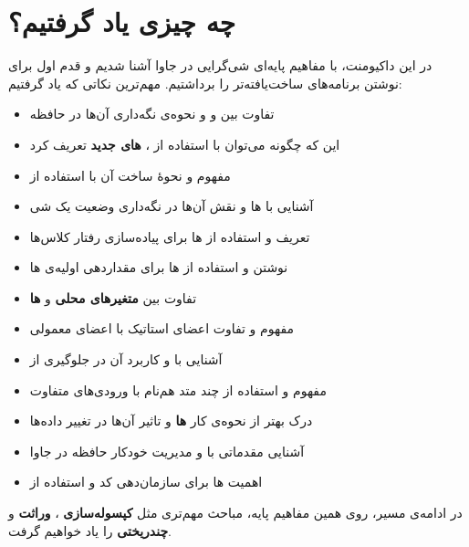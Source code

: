 \section{چه چیزی یاد گرفتیم؟}

در این داکیومنت، با مفاهیم پایه‌ای شی‌گرایی در جاوا آشنا شدیم و قدم اول
برای نوشتن برنامه‌های ساخت‌یافته‌تر را برداشتیم. مهم‌ترین نکاتی که یاد
گرفتیم:

\begin{itemize}
\tightlist
\item
  تفاوت بین \textbf{} و \textbf{}
  و نحوه‌ی نگه‌داری آن‌ها در حافظه
\item
  این که چگونه می‌توان با استفاده از  ،
  \textbf{ های جدید} تعریف کرد
\item
  مفهوم \textbf{} و نحوهٔ ساخت آن با استفاده از
\item
  آشنایی با \textbf{} ها و نقش آن‌ها در نگه‌داری وضعیت یک شی
\item
  تعریف و استفاده از \textbf{} ها برای پیاده‌سازی رفتار کلاس‌ها
\item
  نوشتن و استفاده از \textbf{} ها برای مقداردهی اولیه‌ی
   ها
\item
  تفاوت بین \textbf{متغیرهای محلی} و \textbf{ ها}
\item
  مفهوم \textbf{} و تفاوت اعضای استاتیک با اعضای معمولی
\item
  آشنایی با \textbf{} و کاربرد آن در جلوگیری از 
\item
  مفهوم \textbf{} و استفاده از چند متد هم‌نام با
  ورودی‌های متفاوت
\item
  درک بهتر از نحوه‌ی کار \textbf{ ها} و تاثیر آن‌ها در تغییر
  داده‌ها
\item
  آشنایی مقدماتی با \textbf{} و مدیریت خودکار
  حافظه در جاوا
\item
  اهمیت \textbf{}ها برای سازمان‌دهی کد و استفاده از
\end{itemize}

در ادامه‌ی مسیر، روی همین مفاهیم پایه، مباحث مهم‌تری مثل
\textbf{کپسوله‌سازی } ، \textbf{وراثت
} و \textbf{چندریختی } را یاد
خواهیم گرفت.
	
	
	
	
